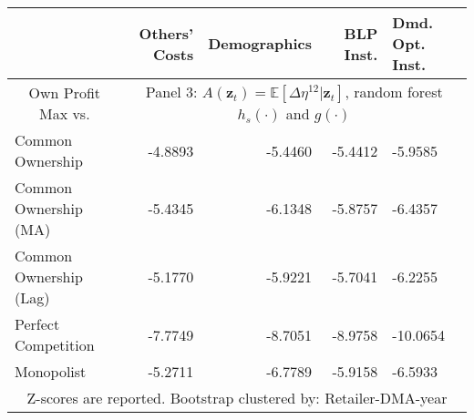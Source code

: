 \begin{tabular}{l r r r b }
\toprule
                        &  Others' Costs &  Demographics &  BLP Inst. &  Dmd. Opt. Inst. \\
\midrule
\multicolumn{1}{c}{Own Profit Max vs.}& \multicolumn{4}{c}{Panel 3: $A(\symbf{z}_t) = \mathbb{E}[\Delta\eta^{12}|\symbf{z}_t]$, random forest $h_s(\cdot)$ and $g(\cdot)$}\\
\cmidrule(lr){1-1} \cmidrule(lr){2-5}
      Common Ownership &        -4.8893 &       -5.4460 &    -5.4412 &          -5.9585 \\
  Common Ownership (MA) &        -5.4345 &       -6.1348 &    -5.8757 &          -6.4357 \\
 Common Ownership (Lag) &        -5.1770 &       -5.9221 &    -5.7041 &          -6.2255 \\
   Perfect Competition &       -7.7749 &       -8.7051 &   -8.9758 &         -10.0654 \\
Monopolist &        -5.2711 &        -6.7789 &   -5.9158 &          -6.5933 \\
\bottomrule
\multicolumn{5}{c}{Z-scores are reported. Bootstrap clustered by: Retailer-DMA-year}
\end{tabular}
